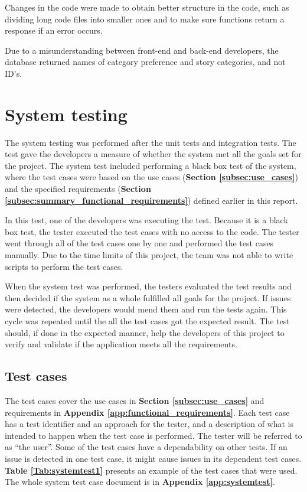 Changes in the code were made to obtain better structure in the code, such as dividing long code files into smaller ones and to make sure functions return a response if an error occurs. \newline

Due to a misunderstanding between front-end and back-end developers, the database returned names of category preference and story categories, and not ID's.

\section{System testing}
The system testing was performed after the unit tests and integration tests. The test gave the developers a measure of whether the system met all the goals set for the project. The system test included performing a black box test of the system, where the test cases were based on the use cases (\textbf{Section \ref{subsec:use_cases}}) and the specified requirements (\textbf{Section \ref{subsec:summary_functional_requirements}})  defined earlier in this report. \newline

In this test, one of the developers was executing the test. Because it is a black box test, the tester executed the test cases with no access to the code. The tester went through all of the test cases one by one and performed the test cases manually. Due to the time limits of this project, the team was not able to write scripts to perform the test cases. \newline

When the system test was performed, the testers evaluated the test results and then decided if the system as a whole fulfilled all goals for the project. If issues were detected, the developers would mend them and run the tests again. This cycle was repeated until the all the test cases got the expected result. The test should, if done in the expected manner, help the developers of this project to verify and validate if the application meets all the requirements.

\subsection{Test cases}
The test cases cover the use cases in \textbf{Section \ref{subsec:use_cases}} and requirements in \textbf{Appendix \ref{app:functional_requirements}}. 
Each test case has a test identifier and an approach for the tester, and a description of what is intended to happen when the test case is performed. The tester will be referred to as “the user”. 
Some of the test cases have a dependability on other tests. If an issue is detected in one test case, it might cause issues in its dependent test cases. \textbf{Table \ref{Tab:systemtest1}} presents an example of the test cases that were used. The whole system test case document is in \textbf{Appendix \ref{app:systemtest}}. 

